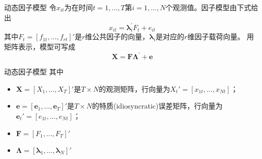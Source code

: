 \documentclass{beamer}
\begin{document}
%
\begin{frame}{动态因子模型}
	令$x_{it}$为在时间$t=1,\ldots, T$第$i=1,\ldots,N$个观测值。因子模型由下式给出\parencite{breitung2011gls}
	$$
	x_{it}=\boldsymbol{\lambda}_i^{\prime}F_t+e_{it}
	$$
	其中$F_t=[f_{1t},\ldots,f_{rt}]'$是$r$维公共因子的向量，$\boldsymbol{\lambda}_i$是对应的$r$维因子载荷向量。
	用矩阵表示，模型可写成
	\begin{equation}
	\mathbf X = \mathbf F\bm \Lambda^{\prime}+\mathbf e
	\end{equation}

	
\end{frame}


%
\begin{frame}{动态因子模型}
		其中
		\begin{itemize}
			\item $\mathbf X=[X_1,\ldots, X_T]'$是$T\times N$的观测矩阵，行向量为$X_t'=[x_{1t}, \ldots, x_{Nt}]$；
			\item $\mathbf e = [\mathbf e_1,\ldots,\mathbf e_T]'$是$T\times N$的特质(idiosyncratic)误差矩阵，行向量为$\mathbf e_t'=[e_{1t},\ldots, e_{Nt}]$；
			\item $\mathbf F=[ F_1, \ldots, F_T]'$
			\item $\bm \Lambda=[\boldsymbol{\lambda}_1,\ldots,\boldsymbol{\lambda}_N]'$
		\end{itemize}	
\end{frame}
\end{document}
